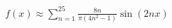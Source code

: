 \documentclass[preview]{standalone}
\begin{document}
\begin{align*}
f(x) \approx \sum_{n=1}^{25} \frac{8n}{\pi(4n^2-1)} \sin(2nx)
\end{align*}
\end{document}
